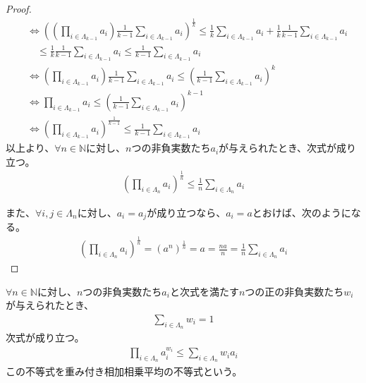 \documentclass[dvipdfmx]{jsarticle}
\begin{document}
\begin{proof}
\begin{align*}
&\Leftrightarrow \left( \left( \prod_{i \in \varLambda_{k - 1}} a_{i} \right)\frac{1}{k - 1}\sum_{i \in \varLambda_{k - 1}} a_{i} \right)^{\frac{1}{k}} \leq \frac{1}{k}\sum_{i \in \varLambda_{k - 1}} a_{i} + \frac{1}{k}\frac{1}{k - 1}\sum_{i \in \varLambda_{k - 1}} a_{i} \\
&\quad \leq \frac{1}{k}\frac{1}{k - 1}\sum_{i \in \varLambda_{k - 1}} a_{i} \leq \frac{1}{k - 1}\sum_{i \in \varLambda_{k - 1}} a_{i}\\
&\Leftrightarrow \left( \prod_{i \in \varLambda_{k - 1}} a_{i} \right)\frac{1}{k - 1}\sum_{i \in \varLambda_{k - 1}} a_{i} \leq \left( \frac{1}{k - 1}\sum_{i \in \varLambda_{k - 1}} a_{i} \right)^{k}\\
&\Leftrightarrow \prod_{i \in \varLambda_{k - 1}} a_{i} \leq \left( \frac{1}{k - 1}\sum_{i \in \varLambda_{k - 1}} a_{i} \right)^{k - 1}\\
&\Leftrightarrow \left( \prod_{i \in \varLambda_{k - 1}} a_{i} \right)^{\frac{1}{k - 1}} \leq \frac{1}{k - 1}\sum_{i \in \varLambda_{k - 1}} a_{i}
\end{align*}
以上より、$\forall n \in \mathbb{N}$に対し、$n$つの非負実数たち$a_{i}$が与えられたとき、次式が成り立つ。
\begin{align*}
\left( \prod_{i \in \varLambda_{n}} a_{i} \right)^{\frac{1}{n}} \leq \frac{1}{n}\sum_{i \in \varLambda_{n}} a_{i}
\end{align*}\par
また、$\forall i,j \in \varLambda_{n}$に対し、$a_{i} = a_{j}$が成り立つなら、$a_{i} = a$とおけば、次のようになる。
\begin{align*}
\left( \prod_{i \in \varLambda_{n}} a_{i} \right)^{\frac{1}{n}} = \left( a^{n} \right)^{\frac{1}{n}} = a = \frac{na}{n} = \frac{1}{n}\sum_{i \in \varLambda_{n}} a_{i}
\end{align*}
\end{proof}
\begin{thm}[重み付き相加相乗平均の不等式]\label{2.3.1.5}
$\forall n \in \mathbb{N}$に対し、$n$つの非負実数たち$a_{i}$と次式を満たす$n$つの正の非負実数たち$w_{i}$が与えられたとき、
\begin{align*}
\sum_{i \in \varLambda_{n}} w_{i} = 1
\end{align*}
次式が成り立つ。
\begin{align*}
\prod_{i \in \varLambda_{n}} a_{i}^{w_{i}} \leq \sum_{i \in \varLambda_{n}} {w_{i}a_{i}}
\end{align*}
この不等式を重み付き相加相乗平均の不等式という。
\end{thm}
\end{document}

